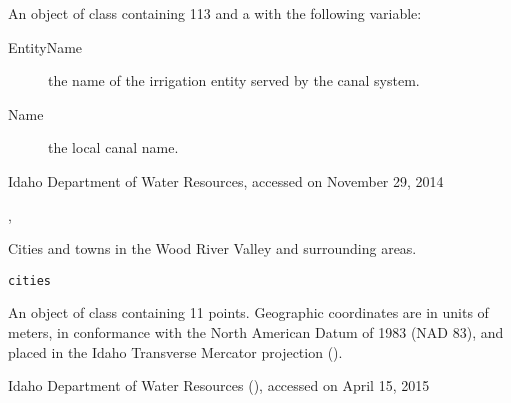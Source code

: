 \documentclass[a4paper]{book}
\begin{document}
%
\begin{Format}
An object of  class containing 113  and a  with the following variable:
\begin{description}

\item[EntityName] the name of the irrigation entity served by the canal system.
\item[Name] the local canal name.

\end{description}

\end{Format}
%
\begin{Source}\relax
Idaho Department of Water Resources, accessed on November 29, 2014
\end{Source}
%
\begin{SeeAlso}\relax
{}, 
\end{SeeAlso}
%
\begin{Examples}
\end{Examples}
%
\begin{Description}\relax
Cities and towns in the Wood River Valley and surrounding areas.
\end{Description}
%
\begin{Usage}
\begin{verbatim}
cities
\end{verbatim}
\end{Usage}
%
\begin{Format}
An object of  class containing 11 points.
Geographic coordinates are in units of meters, in conformance with the North American Datum of 1983 (NAD 83), and placed in the
Idaho Transverse Mercator projection ().
\end{Format}
%
\begin{Source}\relax
Idaho Department of Water Resources (), accessed on April 15, 2015
\end{Source}
%
\begin{Examples}
\end{Examples}
\end{document}
